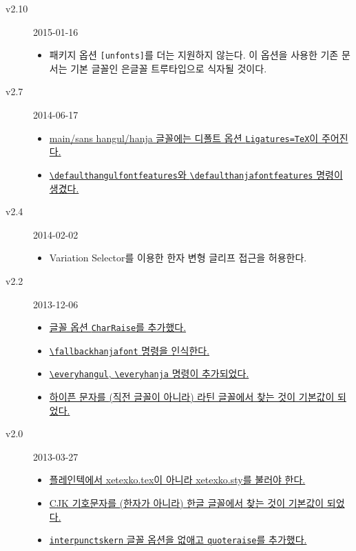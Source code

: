 \documentclass[a4paper]{article}
\def\cs#1{\texttt{\textbackslash #1}}
\def\hparen#1{{\small\hangulparens(#1)}}
\begin{document}
\begin{small}
\begin{description}
\begin{itemize}
      \end{itemize}
    \item[v2.10] 2015-01-16
      \begin{itemize}
        \item 패키지 옵션 \texttt{[unfonts]}를 더는 지원하지 않는다. 이 옵션을
          사용한 기존 문서는 기본 글꼴인 은글꼴 트루타입으로 식자될 것이다.
      \end{itemize}
    \item[v2.7] 2014-06-17
      \begin{itemize}
        \item \hyperref[sec:fontcmds]
          {main/sans hangul/hanja 글꼴에는 디폴트 옵션
          \texttt{Ligatures=TeX}이 주어진다.}
        \item \hyperref[sec:fontopts]
          {\cs{defaulthangulfontfeatures}와 \cs{defaulthanjafontfeatures}
          명령이 생겼다.}
      \end{itemize}
    \item[v2.4] 2014-02-02
      \begin{itemize}
        \item Variation Selector를 이용한 한자 변형 글리프 접근을 허용한다.
      \end{itemize}
    \item[v2.2] 2013-12-06
      \begin{itemize}
        \item \hyperref[sec:fontopts]
          {글꼴 옵션 \texttt{CharRaise}를 추가했다.}
        \item \hyperref[sec:fontcmds]
          {\cs{fallbackhanjafont} 명령을 인식한다.}
        \item \hyperref[sec:etccmds]
          {\cs{everyhangul}, \cs{everyhanja} 명령이 추가되었다.}
        \item \hyperref[sec:symbolfont]
          {하이픈 문자를 \hparen{직전 글꼴이 아니라} 라틴 글꼴에서 찾는
          것이 기본값이 되었다.}
      \end{itemize}
    \item[v2.0] 2013-03-27
      \begin{itemize}
        \item \hyperref[sec:loading]
          {플레인텍에서 xetexko.tex이 아니라 xetexko.sty를 불러야 한다.}
        \item \hyperref[sec:symbolfont]
          {CJK 기호문자를 \hparen{한자가 아니라} 한글 글꼴에서 찾는 것이
          기본값이 되었다.}
        \item \hyperref[sec:fontopts]
          {\texttt{interpunctskern} 글꼴 옵션을 없애고 \texttt{quoteraise}를
          추가했다.}
      \end{itemize}
  \end{description}
\end{small}
\end{document}
